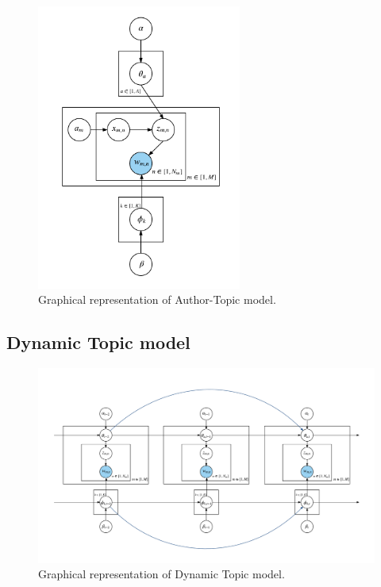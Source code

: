 \begin{figure}[h]
\centering
\includegraphics[width=0.6\textwidth]{figures/AT.png}
\caption{Graphical representation of Author-Topic model.}
\label{fig:atot}
\end{figure}

\subsection{Dynamic Topic model}

\begin{figure}[h]
\centering
\includegraphics[width=\textwidth]{figures/TOT.png}
\caption{Graphical representation of Dynamic Topic model.}
\label{fig:atot}
\end{figure}

